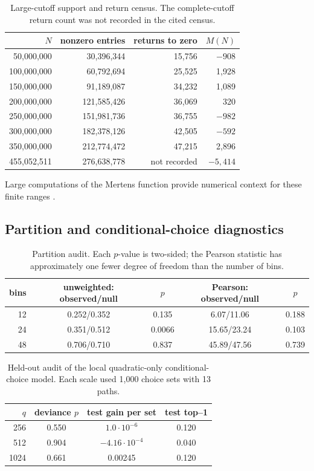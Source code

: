 \documentclass[11pt,reqno]{amsart}
\numberwithin{equation}{section}
\theoremstyle{plain}
\theoremstyle{definition}
\theoremstyle{remark}
\begin{document}
\begin{table}[htbp]
\centering
\caption{Large-cutoff support and return census.  The complete-cutoff return
count was not recorded in the cited census.}
\label{tab:large-cutoff-census}
\begin{tabular}{r r r r}
\toprule
\(N\)&nonzero entries&returns to zero&\(M(N)\)\\
\midrule
50,000,000&30,396,344&15,756&\(-908\)\\
100,000,000&60,792,694&25,525&1,928\\
150,000,000&91,189,087&34,232&1,089\\
200,000,000&121,585,426&36,069&320\\
250,000,000&151,981,736&36,755&\(-982\)\\
300,000,000&182,378,126&42,505&\(-592\)\\
350,000,000&212,774,472&47,215&2,896\\
455,052,511&276,638,778&not recorded&\(-5,414\)\\
\bottomrule
\end{tabular}
\end{table}
Large computations of the Mertens function provide numerical context for
these finite ranges \cite{DelegliseRivat1996,KotnikLune2004,Hurst2018}.

\subsection{Partition and conditional-choice diagnostics}
\label{subsec:numerical-partition-anova}

\begin{table}[htbp]
\centering
\caption{Partition audit.  Each \(p\)-value is two-sided; the Pearson
statistic has approximately one fewer degree of freedom than the number of
bins.}
\label{tab:partition-audit}
\begin{tabular}{r c c c c}
\toprule
bins&unweighted: observed/null&\(p\)&Pearson: observed/null&\(p\)\\
\midrule
12&0.252/0.352&0.135&6.07/11.06&0.188\\
24&0.351/0.512&0.0066&15.65/23.24&0.103\\
48&0.706/0.710&0.837&45.89/47.56&0.739\\
\bottomrule
\end{tabular}
\end{table}

\begin{table}[htbp]
\centering
\caption{Held-out audit of the local quadratic-only conditional-choice
model.  Each scale used 1,000 choice sets with 13 paths.}
\label{tab:local-anova}
\begin{tabular}{r c c c}
\toprule
\(q\)&deviance \(p\)&test gain per set&test top--1\\
\midrule
256&0.550&\(1.0\cdot10^{-6}\)&0.120\\
512&0.904&\(-4.16\cdot10^{-4}\)&0.040\\
1024&0.661&0.00245&0.120\\
\bottomrule
\end{tabular}
\end{table}
\end{document}
